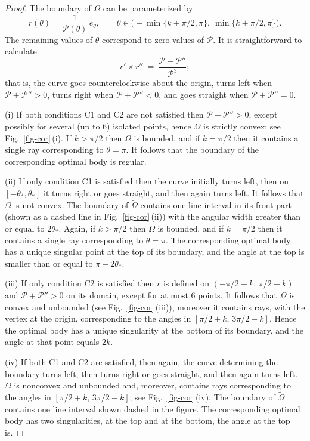\documentclass[a4paper,12pt]{article}
\newcommand {\PPP}{\mathcal{P}}
\theoremstyle{remark}
\theoremstyle{definition}
\begin{document}
\begin{proof}
	
The boundary of $\Omega$ can be parameterized by
$$
r(\theta) = \frac{1}{\PPP(\theta)}\, e_{\theta}, \qquad \theta\in \big(-\min\{k+\pi/2, \pi\},\ \min\{k+\pi/2, \pi \} \big).
$$
The remaining values of $\theta$ correspond to zero values of $\PPP$. It is straightforward to calculate
$$
r' \times r''\ =\ \frac{\PPP +\PPP''}{\PPP^3};
$$
that is, the curve goes counterclockwise about the origin, turns left when $\PPP+ \PPP'' >0$, turns right when $\PPP+ \PPP''<0$, and goes straight when $\PPP+ \PPP''=0$.

(i) If both conditions C1 and C2 are not satisfied then $\PPP+\PPP''>0$, except possibly for several (up to 6) isolated points, hence $\Omega$ is strictly convex; see Fig.~\ref{fig-cor}\,(i). If $k > \pi/2$ then $\Omega$ is bounded, and if $k=\pi/2$ then it contains a single ray corresponding to $\theta=\pi$. It follows that the boundary of the corresponding optimal body is regular.

(ii) If only condition C1 is satisfied then the curve initially turns left, then on $[-\theta_*, \theta_*]$ it turns right or goes straight, and then again turns left. It follows that $\Omega$ is not convex. The boundary of $\tilde\Omega$ contains one line interval in its front part (shown as a dashed line in Fig.~\ref{fig-cor}\,(ii)) with the angular width greater than or equal to $2\theta_*.$  Again, if $k > \pi/2$ then $\Omega$ is bounded, and if $k=\pi/2$ then it contains a single ray corresponding to $\theta=\pi$. The corresponding optimal body has a unique singular point at the top of its boundary, and the angle at the top is smaller than or equal to  $\pi-2\theta_*$.

(iii) If only condition C2 is satisfied then $r$ is defined on $(-\pi/2-k,\, \pi/2+k)$ and $\PPP+\PPP''>0$ on its domain, except for at most 6 points. It follows that $\Omega$ is convex and unbounded (see Fig.~\ref{fig-cor}\,(iii)), moreover it contains rays, with the vertex at the origin, corresponding to the angles in $[\pi/2+k,\, 3\pi/2-k]$. Hence the optimal body has a unique singularity at the bottom of its boundary, and the angle at that point equals $2k.$

(iv) If both C1 and C2 are satisfied, then again, the curve determining the boundary turns left, then turns right or goes straight, and then again turns left. $\Omega$ is nonconvex and unbounded and, moreover, contains rays corresponding to the angles in $[\pi/2+k,\, 3\pi/2-k]$; see Fig.~\ref{fig-cor}\,(iv). The boundary of $\tilde\Omega$ contains one line interval shown dashed in the figure. The corresponding optimal body has two singularities, at the top and at the bottom, the angle at the top is.

\end{proof}
\end{document}
